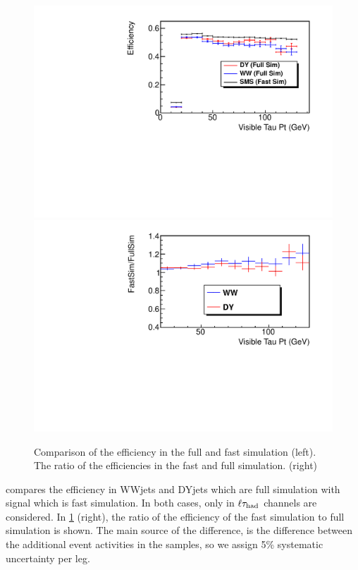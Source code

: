 \begin{figure}[!Hhtb]
\centering
\includegraphics[angle=0,scale=0.35]{SystematicFigs/TauEff_lepTau.pdf}
\includegraphics[angle=0,scale=0.35]{SystematicFigs/TauEff_lepTau_ratio.pdf}
\caption{Comparison of the \Tau efficiency in the full and fast simulation (left). The ratio of the efficiencies in the fast and full simulation. (right)}
\label{fig:TauEffFastFull}
\end{figure}
compares the \Tau efficiency in WWjets and DYjets which are full simulation with signal which is fast simulation. In 
both cases, only \Tau in $\ell\tau_{\rm had}$ channels are considered. In 
\ref{fig:TauEffFastFull} (right), the ratio of the efficiency of the fast simulation to full simulation is shown. 
The main source of the difference, is the difference between the additional event activities in the samples, so we assign 5\% systematic uncertainty per \Tau leg.


